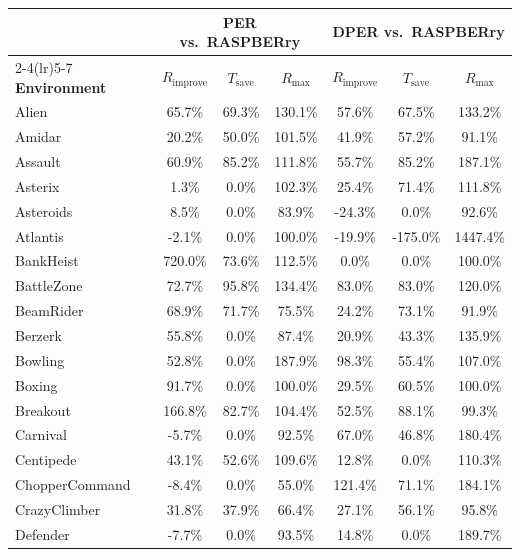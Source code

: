\documentclass[10pt]{article} %
\begin{document}
\begin{table}[htb]
\centering
\begin{tabular}{lcccccc}
\toprule
 & \multicolumn{3}{c}{\textbf{PER vs.\ RASPBERry}} & \multicolumn{3}{c}{\textbf{DPER vs.\ RASPBERry}} \\
\cmidrule(lr){2-4}\cmidrule(lr){5-7}
\textbf{Environment} & $R_{\text{improve}}$ & $T_{\text{save}}$ & $R_{\text{max}}$ & $R_{\text{improve}}$ & $T_{\text{save}}$ & $R_{\text{max}}$ \\
\midrule
Alien          & 65.7\%  & 69.3\%  & 130.1\% & 57.6\% & 67.5\% & 133.2\% \\
Amidar         & 20.2\%  & 50.0\%  & 101.5\% & 41.9\% & 57.2\% & 91.1\%  \\
Assault        & 60.9\%  & 85.2\%  & 111.8\% & 55.7\% & 85.2\% & 187.1\% \\
Asterix        & 1.3\%   & 0.0\%   & 102.3\% & 25.4\% & 71.4\% & 111.8\% \\
Asteroids      & 8.5\%   & 0.0\%   & 83.9\%  & -24.3\% & 0.0\% & 92.6\%  \\
Atlantis       & -2.1\%  & 0.0\%   & 100.0\% & -19.9\% & -175.0\% & 1447.4\% \\
BankHeist      & 720.0\% & 73.6\%  & 112.5\% & 0.0\%   & 0.0\% & 100.0\%  \\
BattleZone     & 72.7\%  & 95.8\%  & 134.4\% & 83.0\% & 83.0\% & 120.0\% \\
BeamRider      & 68.9\%  & 71.7\%  & 75.5\%  & 24.2\% & 73.1\% & 91.9\%  \\
Berzerk        & 55.8\%  & 0.0\%   & 87.4\%  & 20.9\% & 43.3\% & 135.9\% \\
Bowling        & 52.8\%  & 0.0\%   & 187.9\% & 98.3\% & 55.4\% & 107.0\% \\
Boxing         & 91.7\%  & 0.0\%   & 100.0\% & 29.5\% & 60.5\% & 100.0\% \\
Breakout       & 166.8\% & 82.7\%  & 104.4\% & 52.5\% & 88.1\% & 99.3\%  \\
Carnival       & -5.7\%  & 0.0\%   & 92.5\%  & 67.0\% & 46.8\% & 180.4\% \\
Centipede      & 43.1\%  & 52.6\%  & 109.6\% & 12.8\% & 0.0\% & 110.3\%  \\
ChopperCommand & -8.4\%  & 0.0\%   & 55.0\%  & 121.4\% & 71.1\% & 184.1\% \\
CrazyClimber   & 31.8\%  & 37.9\%  & 66.4\%  & 27.1\% & 56.1\% & 95.8\%  \\
Defender       & -7.7\%  & 0.0\%   & 93.5\%  & 14.8\% & 0.0\% & 189.7\% \\

\end{tabular}
\end{table}
\end{document}
